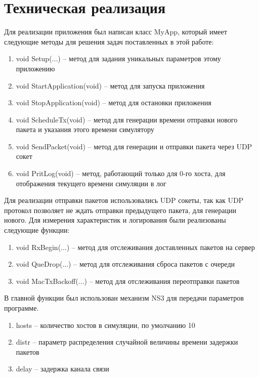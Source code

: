 \documentclass[a4peper, 12pt, titlepage, finall]{extreport}
\begin{document}
    \section{Техническая реализация}
        Для реализации приложения был написан класс {\ttfamily MyApp}, который имеет следующие методы для решения задач поставленных в этой работе:
        \begin{enumerate}
            \item {\ttfamily void Setup(...)} -- метод для задания уникальных параметров этому приложению
            \item {\ttfamily void StartApplication(void)} -- метод для запуска приложения
            \item {\ttfamily void StopApplication(void)} -- метод для остановки приложения
            \item {\ttfamily void ScheduleTx(void)} -- метод для генерации времени отправки нового пакета и указания этого времени симулятору
            \item {\ttfamily void SendPacket(void)} -- метод для генерации и отправки пакета через UDP сокет
            \item {\ttfamily void PritLog(void)} -- метод, работающий только для 0-го хоста, для отображения текущего времени симуляции в лог
        \end{enumerate}
        Для реализации отправки пакетов использовались UDP сокеты, так как UDP протокол позволяет не ждать отправки предыдущего пакета, для генерации нового.
        Для измерения характеристик и логирования были реализованы следующие функции:
        \begin{enumerate}
            \item {\ttfamily void RxBegin(...)} -- метод для отслеживания доставленных пакетов на сервер
            \item {\ttfamily void QueDrop(...)} -- метод для отслеживания сброса пакетов с очереди
            \item {\ttfamily void MacTxBackoff(...)} -- метод для отслеживания переотправки пакетов
        \end{enumerate}
        В главной функции был использован механизм NS3 для передачи параметров программе. 
        \begin{enumerate}
            \item {\ttfamily hosts} -- количество хостов в симуляции, по умолчанию 10
            \item {\ttfamily distr} -- параметр распределения случайной величины времени задержки пакетов
            \item {\ttfamily delay} -- задержка канала связи
        \end{enumerate}
\end{document}
